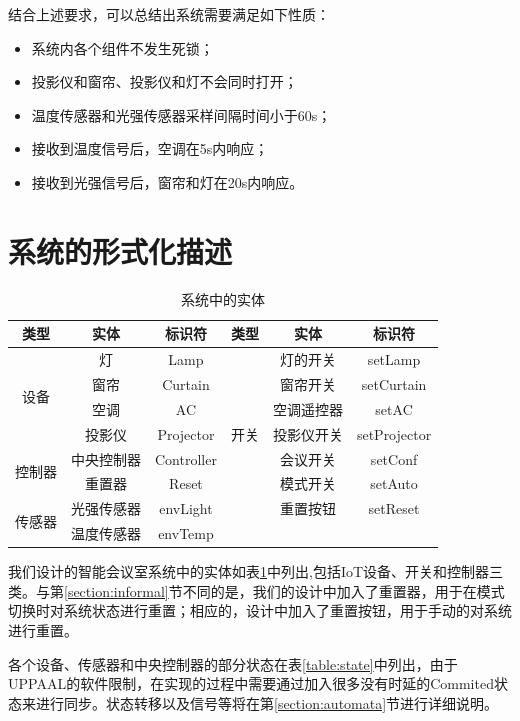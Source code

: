 \documentclass[journal, a4paper]{IEEEtran}
\begin{document}
结合上述要求，可以总结出系统需要满足如下性质：

\begin{itemize}
    \item 系统内各个组件不发生死锁；
    \item 投影仪和窗帘、投影仪和灯不会同时打开；
    \item 温度传感器和光强传感器采样间隔时间小于60s；
    \item 接收到温度信号后，空调在5s内响应；
    \item 接收到光强信号后，窗帘和灯在20s内响应。
\end{itemize}

\section{系统的形式化描述}
\label{section:formal}

\begin{table}[b]\scriptsize
    \centering
    \begin{tabular}{cccccc}
    \toprule
        类型 & 实体 & 标识符 & 类型 & 实体 & 标识符 \\
    \midrule
        \multirow{4}{*}{设备} & 灯 & Lamp & \multirow{7}{*}{开关} & 灯的开关 & setLamp \\
         & 窗帘 & Curtain & & 窗帘开关 & setCurtain \\
         & 空调 & AC & & 空调遥控器 & setAC \\
         & 投影仪 & Projector & & 投影仪开关 & setProjector \\
    \cline{1-3}
        \multirow{2}{*}{控制器} & 中央控制器 & Controller & & 会议开关 & setConf \\
         & 重置器 & Reset & & 模式开关 & setAuto \\
    \cline{1-3}
        \multirow{2}{*}{传感器} & 光强传感器 & envLight & & 重置按钮 & setReset \\
         & 温度传感器 & envTemp \\
    \bottomrule
    \end{tabular}
    \caption{系统中的实体}
    \label{table:entity}
\end{table}

我们设计的智能会议室系统中的实体如表\ref{table:entity}中列出,包括IoT设备、开关和控制器三类。与第\ref{section:informal}节不同的是，我们的设计中加入了重置器，用于在模式切换时对系统状态进行重置；相应的，设计中加入了重置按钮，用于手动的对系统进行重置。

各个设备、传感器和中央控制器的部分状态在表\ref{table:state}中列出，由于UPPAAL的软件限制，在实现的过程中需要通过加入很多没有时延的Commited状态来进行同步。状态转移以及信号等将在第\ref{section:automata}节进行详细说明。
\end{document}

